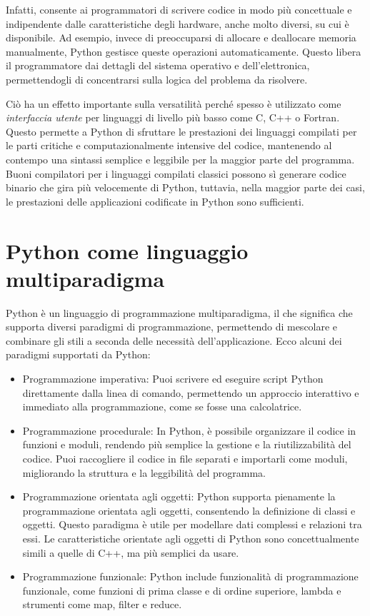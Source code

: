 \documentclass[
  letterpaper,
]{scrbook}
\providecommand{\tightlist}{%
  \setlength{\itemsep}{0pt}\setlength{\parskip}{0pt}}\usepackage{longtable,booktabs,array}
\begin{document}
Infatti, consente ai programmatori di scrivere codice in modo più
concettuale e indipendente dalle caratteristiche degli hardware, anche
molto diversi, su cui è disponibile. Ad esempio, invece di preoccuparsi
di allocare e deallocare memoria manualmente, Python gestisce queste
operazioni automaticamente. Questo libera il programmatore dai dettagli
del sistema operativo e dell'elettronica, permettendogli di concentrarsi
sulla logica del problema da risolvere.

Ciò ha un effetto importante sulla versatilità perché spesso è
utilizzato come \emph{interfaccia utente} per linguaggi di livello più
basso come C, C++ o Fortran. Questo permette a Python di sfruttare le
prestazioni dei linguaggi compilati per le parti critiche e
computazionalmente intensive del codice, mantenendo al contempo una
sintassi semplice e leggibile per la maggior parte del programma. Buoni
compilatori per i linguaggi compilati classici possono sì generare
codice binario che gira più velocemente di Python, tuttavia, nella
maggior parte dei casi, le prestazioni delle applicazioni codificate in
Python sono sufficienti.

\section{Python come linguaggio
multiparadigma}\label{python-come-linguaggio-multiparadigma}

Python è un linguaggio di programmazione multiparadigma, il che
significa che supporta diversi paradigmi di programmazione, permettendo
di mescolare e combinare gli stili a seconda delle necessità
dell'applicazione. Ecco alcuni dei paradigmi supportati da Python:

\begin{itemize}
\tightlist
\item
  Programmazione imperativa: Puoi scrivere ed eseguire script Python
  direttamente dalla linea di comando, permettendo un approccio
  interattivo e immediato alla programmazione, come se fosse una
  calcolatrice.
\item
  Programmazione procedurale: In Python, è possibile organizzare il
  codice in funzioni e moduli, rendendo più semplice la gestione e la
  riutilizzabilità del codice. Puoi raccogliere il codice in file
  separati e importarli come moduli, migliorando la struttura e la
  leggibilità del programma.
\item
  Programmazione orientata agli oggetti: Python supporta pienamente la
  programmazione orientata agli oggetti, consentendo la definizione di
  classi e oggetti. Questo paradigma è utile per modellare dati
  complessi e relazioni tra essi. Le caratteristiche orientate agli
  oggetti di Python sono concettualmente simili a quelle di C++, ma più
  semplici da usare.
\item
  Programmazione funzionale: Python include funzionalità di
  programmazione funzionale, come funzioni di prima classe e di ordine
  superiore, lambda e strumenti come map, filter e reduce.
\end{itemize}
\end{document}
